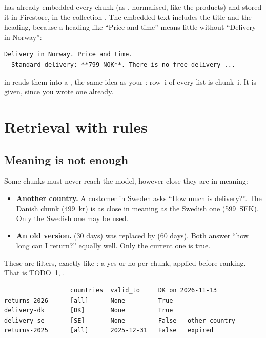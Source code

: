 \documentclass[11pt]{article}
\begin{document}
 has already embedded every chunk (as
, normalised, like the products) and stored
it in Firestore, in the collection . The embedded
text includes the title and the heading, because a heading like ``Price
and time'' means little without ``Delivery in Norway'':
\begin{lstlisting}
Delivery in Norway. Price and time.
- Standard delivery: **799 NOK**. There is no free delivery ...
\end{lstlisting}

 in  reads them into a
, the same idea as your : row~i of every
list is chunk~i. It is given, since you wrote one already.

\section{Retrieval with rules}

\subsection{Meaning is not enough}

Some chunks must never reach the model, however close they are in
meaning:
\begin{itemize}[leftmargin=1.4em, itemsep=2pt]
\item \textbf{Another country.} A customer in Sweden asks ``How much is
  delivery?''. The Danish chunk (499~kr) is as close in meaning as the
  Swedish one (599~SEK). Only the Swedish one may be used.
\item \textbf{An old version.}  (30 days) was
  replaced by  (60 days). Both answer ``how long can
  I return?'' equally well. Only the current one is true.
\end{itemize}
These are filters, exactly like : a yes or no
per chunk, applied before ranking. That is TODO~1,
.

\begin{lstlisting}
                  countries  valid_to     DK on 2026-11-13
returns-2026      [all]      None         True
delivery-dk       [DK]       None         True
delivery-se       [SE]       None         False   other country
returns-2025      [all]      2025-12-31   False   expired
\end{lstlisting}
\end{document}
